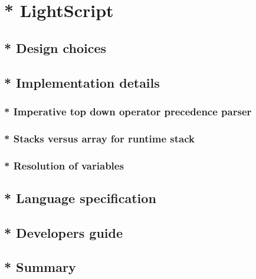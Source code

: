 \chapter{* LightScript}
\label{lightscript}
\section{* Design choices}
\section{* Implementation details}
\subsection{* Imperative top down operator precedence parser}
\subsection{* Stacks versus array for runtime stack}
\subsection{* Resolution of variables}
\section{* Language specification}
\section{* Developers guide}
\section{* Summary}
